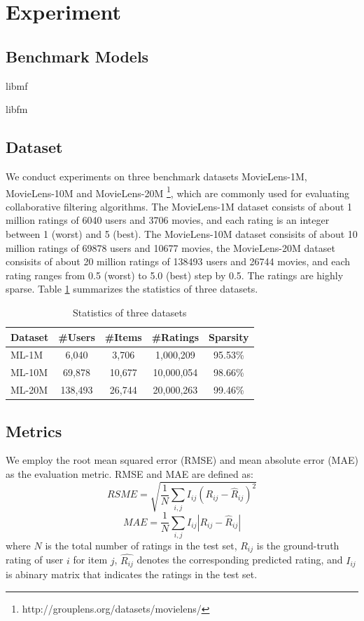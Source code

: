 \documentclass{sig-alternate-05-2015}
\begin{document}
\section{Experiment}

\subsection{Benchmark Models}
libmf \cite{chin2015fast}

libfm \cite{rendle2012factorization}

\subsection{Dataset}
We conduct experiments on three benchmark datasets MovieLens-1M, MovieLens-10M and MovieLens-20M
\footnote{http://grouplens.org/datasets/movielens/},
which are commonly used for evaluating collaborative filtering algorithms.
The MovieLens-1M dataset consists of about 1 million ratings of 6040 users and 3706 movies,
and each rating is an integer between 1 (worst) and 5 (best).
The MovieLens-10M dataset consisits of about 10 million ratings of 69878 users and 10677 movies,
the MovieLens-20M dataset consisits of about 20 million ratings of 138493 users and 26744 movies,
and each rating ranges from 0.5 (worst) to 5.0 (best) step by 0.5.
The ratings are highly sparse.
Table \ref{tab:statistics} summarizes the statistics of three datasets.

\begin{table}[htpb]
	\centering
	\caption{Statistics of three datasets}
	\label{tab:statistics}
	\begin{tabular}{|l|c|c|c|c|}
		\hline
		\textbf{Dataset} & \textbf{\#Users} & \textbf{\#Items} & \textbf{\#Ratings} & \textbf{Sparsity} \\
		\hline
		ML-1M  & 6,040   & 3,706  & 1,000,209  & 95.53\% \\
		ML-10M & 69,878  & 10,677 & 10,000,054 & 98.66\% \\
		ML-20M & 138,493 & 26,744 & 20,000,263 & 99.46\% \\
		\hline
	\end{tabular}
\end{table}

\subsection{Metrics}
We employ the root mean squared error (RMSE) and mean absolute error (MAE) as the evaluation metric.
RMSE and MAE are defined as:
\begin{equation}
	RSME = \sqrt{ \frac{1}{N} \sum_{i,j} I_{ij} (R_{ij} - \hat{R}_{ij})^2 }
\end{equation}
\begin{equation}
	MAE = \frac{1}{N} \sum_{i,j} I_{ij} |R_{ij} - \hat{R}_{ij}|
\end{equation}
where $N$ is the total number of ratings in the test set,
$R_{ij}$ is the ground-truth rating of user $i$ for item $j$,
$\hat{R_{ij}}$ denotes the corresponding predicted rating,
and $I_{ij}$ is abinary matrix that indicates the ratings in the test set.
\end{document}

